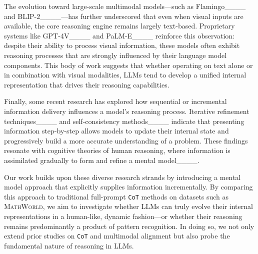 The evolution toward large-scale multimodal models—such as Flamingo____ and BLIP-2____—has further underscored that even when visual inputs are available, the core reasoning engine remains largely text-based. Proprietary systems like GPT-4V____ and PaLM-E____ reinforce this observation: despite their ability to process visual information, these models often exhibit reasoning processes that are strongly influenced by their language model components. This body of work suggests that whether operating on text alone or in combination with visual modalities, LLMs tend to develop a unified internal representation that drives their reasoning capabilities.

Finally, some recent research has explored how sequential or incremental information delivery influences a model’s reasoning process. Iterative refinement techniques____ and self-consistency methods____ indicate that presenting information step-by-step allows models to update their internal state and progressively build a more accurate understanding of a problem. These findings resonate with cognitive theories of human reasoning, where information is assimilated gradually to form and refine a mental model____. 

Our work builds upon these diverse research strands by introducing a mental model approach that explicitly supplies information incrementally. By comparing this approach to traditional full-prompt \texttt{CoT} methods on datasets such as \textsc{MathWorld}, we aim to investigate whether LLMs can truly evolve their internal representations in a human-like, dynamic fashion—or whether their reasoning remains predominantly a product of pattern recognition. In doing so, we not only extend prior studies on \texttt{CoT} and multimodal alignment but also probe the fundamental nature of reasoning in LLMs.